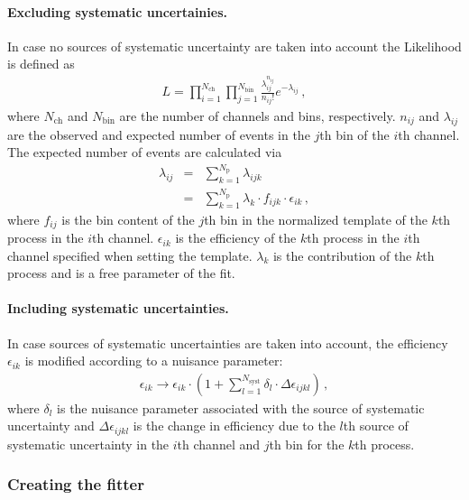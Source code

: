 \documentclass[11pt, a4paper]{article}
\begin{document}
\paragraph{Excluding systematic uncertainies.}
In case no sources of systematic uncertainty are taken into account
the Likelihood is defined as
%
\begin{eqnarray}
L = \prod_{i=1}^{N_{\mathrm{ch}}} \prod_{j=1}^{N_{\mathrm{bin}}} \frac{\lambda_{ij}^{n_{ij}}}{n_{ij}!} e^{-\lambda_{ij}} \, ,
\label{eqn:likelihood}
\end{eqnarray}
%
where $N_{\mathrm{ch}}$ and $N_{\mathrm{bin}}$ are the number of
channels and bins, respectively. $n_{ij}$ and $\lambda_{ij}$ are the
observed and expected number of events in the $j$th bin of the $i$th
channel. The expected number of events are calculated via
%
\begin{eqnarray}
\lambda_{ij} & = & \sum_{k=1}^{N_{\mathrm{p}}} \lambda_{ijk} \\
            & = & \sum_{k=1}^{N_{\mathrm{p}}} \lambda_{k} \cdot f_{ijk} \cdot \epsilon_{ik} \, ,
\label{eqn:expectation}
\end{eqnarray}
%
where $f_{ij}$ is the bin content of the $j$th bin in the normalized
template of the $k$th process in the $i$th channel. $\epsilon_{ik}$ is
the efficiency of the $k$th process in the $i$th channel specified
when setting the template. $\lambda_{k}$ is the contribution of the
$k$th process and is a free parameter of the fit.

\paragraph{Including systematic uncertainties.}
In case sources of systematic uncertainties are taken into account,
the efficiency $\epsilon_{ik}$ is modified according to a nuisance
parameter:
%
\begin{eqnarray}
\epsilon_{ik} \rightarrow \epsilon_{ik} \cdot (1 + \sum_{l=1}^{N_{\mathrm{syst}}} \delta_{l}\cdot \Delta\epsilon_{ijkl}) \, ,
\label{eqn:systematic}
\end{eqnarray}
%
where $\delta_{l}$ is the nuisance parameter associated with the
source of systematic uncertainty and $\Delta\epsilon_{ijkl}$ is the
change in efficiency due to the $l$th source of systematic uncertainty
in the $i$th channel and $j$th bin for the $k$th process.

\subsubsection{Creating the fitter}
\label{section:basics}
\end{document}
